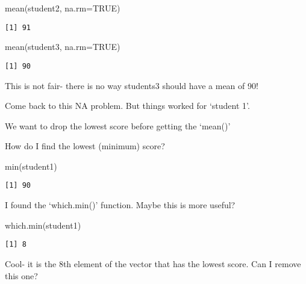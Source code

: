 \documentclass[
  letterpaper,
  DIV=11,
  numbers=noendperiod]{scrartcl}
\newenvironment{Shaded}{\begin{snugshade}}{\end{snugshade}}
\newcommand{\AttributeTok}[1]{\textcolor[rgb]{0.40,0.45,0.13}{#1}}
\newcommand{\ConstantTok}[1]{\textcolor[rgb]{0.56,0.35,0.01}{#1}}
\newcommand{\FunctionTok}[1]{\textcolor[rgb]{0.28,0.35,0.67}{#1}}
\newcommand{\NormalTok}[1]{\textcolor[rgb]{0.00,0.23,0.31}{#1}}
\begin{document}
\begin{Shaded}
\begin{Highlighting}[]
\FunctionTok{mean}\NormalTok{(student2, }\AttributeTok{na.rm=}\ConstantTok{TRUE}\NormalTok{)}
\end{Highlighting}
\end{Shaded}

\begin{verbatim}
[1] 91
\end{verbatim}

\begin{Shaded}
\begin{Highlighting}[]
\FunctionTok{mean}\NormalTok{(student3, }\AttributeTok{na.rm=}\ConstantTok{TRUE}\NormalTok{)}
\end{Highlighting}
\end{Shaded}

\begin{verbatim}
[1] 90
\end{verbatim}

This is not fair- there is no way students3 should have a mean of 90!

Come back to this NA problem. But things worked for `student 1'.

We want to drop the lowest score before getting the `mean()'

How do I find the lowest (minimum) score?

\begin{Shaded}
\begin{Highlighting}[]
\FunctionTok{min}\NormalTok{(student1)}
\end{Highlighting}
\end{Shaded}

\begin{verbatim}
[1] 90
\end{verbatim}

I found the `which.min()' function. Maybe this is more useful?

\begin{Shaded}
\begin{Highlighting}[]
\FunctionTok{which.min}\NormalTok{(student1)}
\end{Highlighting}
\end{Shaded}

\begin{verbatim}
[1] 8
\end{verbatim}

Cool- it is the 8th element of the vector that has the lowest score. Can
I remove this one?
\end{document}
